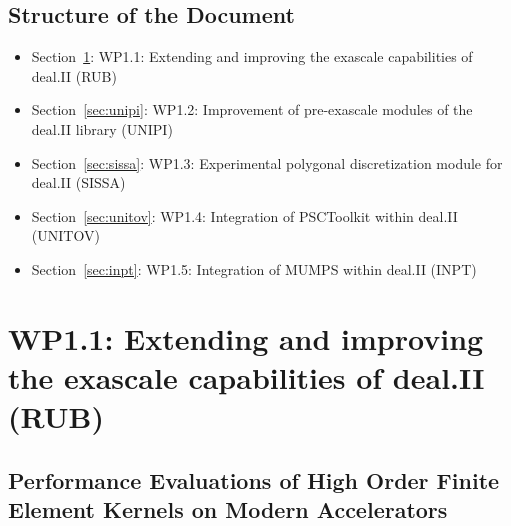 \documentclass[a4paper,12pt]{article}
\begin{document}
\subsection{{Structure of the Document}}
\begin{itemize}
    \item Section~\ref{sec:rub}: WP1.1: Extending and improving the exascale capabilities of deal.II (RUB)
    \item Section~\ref{sec:unipi}: WP1.2: Improvement of pre-exascale modules of the deal.II library (UNIPI)
    \item Section~\ref{sec:sissa}: WP1.3: Experimental polygonal discretization module for deal.II (SISSA)
    \item Section~\ref{sec:unitov}: WP1.4: Integration of PSCToolkit within deal.II (UNITOV)
    \item Section~\ref{sec:inpt}: WP1.5: Integration of MUMPS within deal.II (INPT)
\end{itemize}


\newpage


\section{WP1.1: Extending and improving the exascale capabilities of deal.II (RUB)}
\label{sec:rub}

\subsection{{Performance Evaluations of High Order Finite Element Kernels on Modern Accelerators}}
\end{document}
